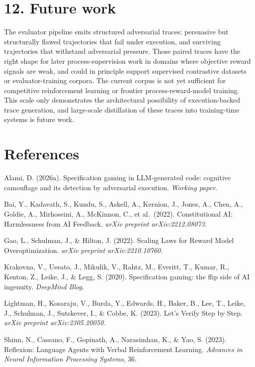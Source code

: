\documentclass[
  11pt]{article}
\begin{document}
\section{12. Future work}\label{future-work}

The evaluator pipeline emits structured adversarial traces: persuasive
but structurally flawed trajectories that fail under execution, and
surviving trajectories that withstand adversarial pressure. Those paired
traces have the right shape for later process-supervision work in
domains where objective reward signals are weak, and could in principle
support supervised contrastive datasets or evaluator-training corpora.
The current corpus is not yet sufficient for competitive reinforcement
learning or frontier process-reward-model training. This scale only
demonstrates the architectural possibility of execution-backed trace
generation, and large-scale distillation of these traces into
training-time systems is future work.

\section{References}\label{references}

Alami, D. (2026a). Specification gaming in LLM-generated code: cognitive
camouflage and its detection by adversarial execution. \emph{Working
paper}.

Bai, Y., Kadavath, S., Kundu, S., Askell, A., Kernion, J., Jones, A.,
Chen, A., Goldie, A., Mirhoseini, A., McKinnon, C., et al.~(2022).
Constitutional AI: Harmlessness from AI Feedback. \emph{arXiv preprint
arXiv:2212.08073}.

Gao, L., Schulman, J., \& Hilton, J. (2022). Scaling Laws for Reward
Model Overoptimization. \emph{arXiv preprint arXiv:2210.10760}.

Krakovna, V., Uesato, J., Mikulik, V., Rahtz, M., Everitt, T., Kumar,
R., Kenton, Z., Leike, J., \& Legg, S. (2020). Specification gaming: the
flip side of AI ingenuity. \emph{DeepMind Blog}.

Lightman, H., Kosaraju, V., Burda, Y., Edwards, H., Baker, B., Lee, T.,
Leike, J., Schulman, J., Sutskever, I., \& Cobbe, K. (2023). Let's
Verify Step by Step. \emph{arXiv preprint arXiv:2305.20050}.

Shinn, N., Cassano, F., Gopinath, A., Narasimhan, K., \& Yao, S. (2023).
Reflexion: Language Agents with Verbal Reinforcement Learning.
\emph{Advances in Neural Information Processing Systems}, 36.
\end{document}
